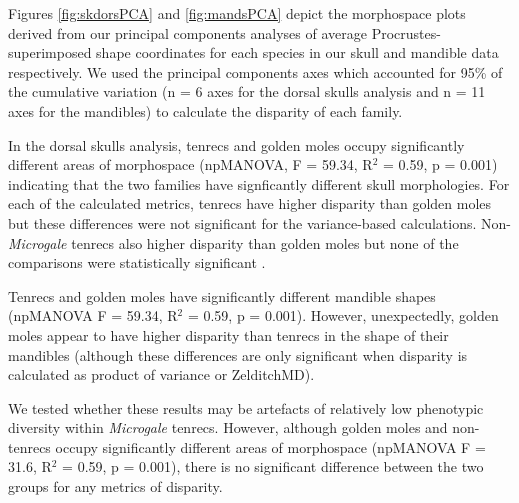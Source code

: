 \documentclass[12pt,a4paper]{article}
\begin{document}
Figures  \ref{fig:skdorsPCA} and \ref{fig:mandsPCA} 
depict the morphospace plots derived from our principal components analyses of average Procrustes-superimposed shape coordinates for each species in our skull and mandible data respectively. We used the principal components axes which accounted for 95\% of the cumulative variation (n = 6 axes for the dorsal skulls analysis and n = 11 axes for the mandibles) to calculate the disparity of each family. 

In the dorsal skulls analysis, tenrecs and golden moles occupy significantly different areas of morphospace (npMANOVA, F = 59.34, R$^2 $ = 0.59, p = 0.001) indicating that the two families have signficantly different skull morphologies. 
For each of the calculated metrics, tenrecs have higher disparity than golden moles but these differences were not significant for the variance-based calculations.  
Non-\textit{Microgale} tenrecs also higher disparity than golden moles but none of the comparisons were statistically significant .

Tenrecs and golden moles have significantly different mandible shapes (npMANOVA F = 59.34, R$^2$ = 0.59, p =	0.001). However, unexpectedly, golden moles appear to have higher disparity than tenrecs in the shape of their mandibles (although these differences are only significant when disparity is calculated as product of variance or ZelditchMD). 

We tested whether these results may be artefacts of relatively low phenotypic diversity within \textit{Microgale} tenrecs. However, although golden moles and non- tenrecs occupy significantly different areas of morphospace (npMANOVA F = 31.6, R$^2$ = 0.59, p =	0.001), there is no significant difference between the two groups for any metrics of disparity. %




\end{document}
